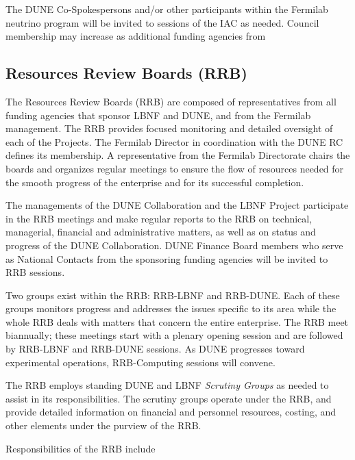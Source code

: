 The DUNE Co-Spokespersons and/or other participants within
the Fermilab neutrino program will be invited to sessions of the IAC as
needed. Council membership may increase as additional funding agencies
from %

\subsection{Resources Review Boards (RRB)}

The Resources Review Boards (RRB) are composed of representatives from all
funding agencies that sponsor LBNF and DUNE, and from the Fermilab
management. The RRB provides focused monitoring and detailed oversight
of each of the Projects. The Fermilab Director in coordination
with the DUNE RC defines its membership. A representative from the
Fermilab Directorate chairs the boards and
organizes regular meetings to ensure the flow of resources needed
for the smooth progress of the enterprise 
and for its successful completion.  

The managements of the
DUNE Collaboration and the LBNF Project participate in the RRB meetings
and make regular reports to the RRB on technical, managerial,
financial and administrative matters, as well as on status and
progress of the DUNE Collaboration.
DUNE Finance Board members who serve as National Contacts from the 
sponsoring funding agencies will be invited to RRB sessions.

Two groups exist  
within the RRB: RRB-LBNF and RRB-DUNE. Each of
these groups monitors progress and addresses 
 the issues specific to its area 
 while the whole RRB deals with matters
that concern the entire enterprise. 
The RRB meet
biannually; these meetings 
start with a plenary
opening session 
and are followed by 
RRB-LBNF and RRB-DUNE sessions. As DUNE progresses toward
experimental operations, RRB-Computing sessions will convene.


The RRB  employs standing DUNE and LBNF \textit{Scrutiny Groups} as needed
to assist in its responsibilities. The scrutiny groups operate
under the RRB, and provide detailed information on financial and
personnel resources, costing, and other elements under the purview of the RRB.

Responsibilities of the RRB include

